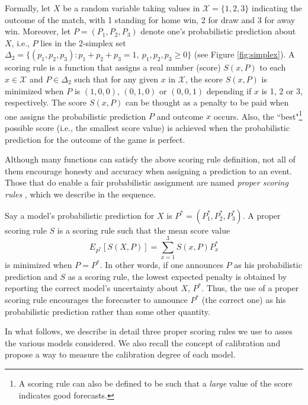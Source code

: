 \documentclass[journal,article,accept,moreauthors,pdftex,12pt,a4paper]{mdpi}
\begin{document}
	Formally, let $X$ be a random variable
	taking values in $\mathcal{X}=\{1,2,3\}$ indicating
	the outcome of the match, with 1 standing for home win, 2 for draw and 3 for away win.  Moreover, let $P=(P_1,P_2,P_3)$ denote one's probabilistic prediction
	about $X$, i.e., $P$ lies in the 2-simplex set $\Delta_2=\{(p_1,p_2,p_3):p_1+p_2+p_3=1, \ p_1,p_2,p_3\geq0\}$ (see Figure
	\ref{fig:simplex}). 	
	A scoring rule is a function 
	that assigns a real number (score) $S(x,P)$ to each $x \in \mathcal{X}$
	and $P \in \Delta_2$ 
	such that 
	for any given $x$ in $\mathcal{X}$, the score  $S(x,P)$ is minimized when $P$ is 
	$(1,0,0)$, $(0,1,0)$ or $(0,0,1)$ depending if $x$ is 1, 2 or 3, respectively.
	The score $S(x,P)$ can be thought as
	a penalty to be paid when one assigns the 
	probabilistic prediction $P$ and outcome
	$x$ occurs. Also, the ``best"\footnote{A scoring rule can also be defined to be such that a \emph{large} value of the score indicates good forecasts.} possible score (i.e., the smallest score value) is achieved when the probabilistic prediction for the outcome of the game is perfect.
	
	Although many functions can satisfy the above scoring rule definition, not all of them encourage honesty and accuracy when assigning a prediction to an event. Those that do enable a fair probabilistic assignment are named \emph{proper scoring rules} \cite{lad}, which we describe in the sequence.
	
	
	Say a model's probabilistic prediction for $X$ is $P^*=(P_1^*,P_2^*,P_3^*).$ A proper scoring rule $S$ is a scoring rule  such that the mean score value 
	$$E_{P^*}[S(X,P)]=\sum_{x=1}^3 S(x,P)P^*_x$$
	 is minimized when $P=P^*$.
	In other words, if one announces
	$P$ as his probabilistic prediction
	and $S$ as a scoring rule, the lowest
	expected penalty is obtained by reporting the correct model's  uncertainty about $X$, $P^*$.
	Thus, the use of a proper scoring rule encourages the forecaster to announce $P^*$ (the correct one)
	as his probabilistic prediction  rather than some other quantity. 
	
	In what follows, we describe in detail three proper scoring rules we use to asses the various models considered.
	We also recall the concept of calibration and propose a way to measure the calibration degree of each model.
	
\end{document}
